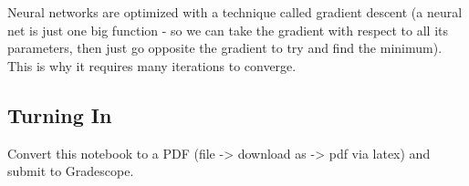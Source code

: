 \documentclass[11pt]{article}
\begin{document}
    Neural networks are optimized with a technique called gradient descent
(a neural net is just one big function - so we can take the gradient
with respect to all its parameters, then just go opposite the gradient
to try and find the minimum). This is why it requires many iterations to
converge.

    \hypertarget{turning-in}{%
\subsection{Turning In}\label{turning-in}}

    Convert this notebook to a PDF (file -\textgreater{} download as
-\textgreater{} pdf via latex) and submit to Gradescope.


    
    
    
    
\end{document}
